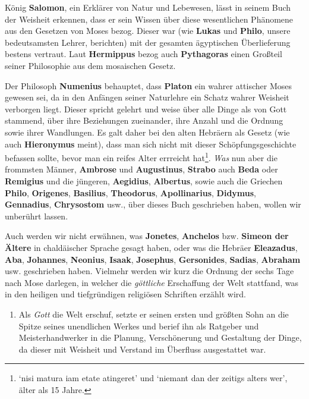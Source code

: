 \documentclass[
]{article}
\providecommand{\tightlist}{%
  \setlength{\itemsep}{0pt}\setlength{\parskip}{0pt}}
\begin{document}
König \textbf{Salomon}, ein Erklärer von Natur und Lebewesen, lässt in
seinem Buch der Weisheit erkennen, dass er sein Wissen über diese
wesentlichen Phänomene aus den Gesetzen von Moses bezog. Dieser war (wie
\textbf{Lukas} und \textbf{Philo}, unsere bedeutsamsten Lehrer,
berichten) mit der gesamten ägyptischen Überlieferung bestens vertraut.
Laut \textbf{Hermippus} bezog auch \textbf{Pythagoras} einen Großteil
seiner Philosophie aus dem mosaischen Gesetz.

Der Philosoph \textbf{Numenius} behauptet, dass \textbf{Platon} ein
wahrer attischer Moses gewesen sei, da in den Anfängen seiner Naturlehre
ein Schatz wahrer Weisheit verborgen liegt. Dieser spricht gelehrt und
weise über alle Dinge als von Gott stammend, über ihre Beziehungen
zueinander, ihre Anzahl und die Ordnung sowie ihrer Wandlungen. Es galt
daher bei den alten Hebräern als Gesetz (wie auch \textbf{Hieronymus}
meint), dass man sich nicht mit dieser Schöpfungsgeschichte befassen
sollte, bevor man ein reifes Alter errreicht hat\footnote{`nisi matura
  iam etate atingeret' und `niemant dan der zeitigs alters wer', älter
  als 15 Jahre.}. \emph{Was} nun aber die frommsten Männer,
\textbf{Ambrose} und \textbf{Augustinus}, \textbf{Strabo} auch
\textbf{Beda} oder \textbf{Remigius} und die jüngeren,
\textbf{Aegidius}, \textbf{Albertus}, sowie auch die Griechen
\textbf{Philo}, \textbf{Origenes}, \textbf{Basilius},
\textbf{Theodorus}, \textbf{Apollinarius}, \textbf{Didymus},
\textbf{Gennadius}, \textbf{Chrysostom} usw., über dieses Buch
geschrieben haben, wollen wir unberührt lassen.

Auch werden wir nicht erwähnen, was \textbf{Jonetes}, \textbf{Anchelos}
bzw. \textbf{Simeon der Ältere} in chaldäischer Sprache gesagt haben,
oder was die Hebräer \textbf{Eleazadus}, \textbf{Aba},
\textbf{Johannes}, \textbf{Neonius}, \textbf{Isaak}, \textbf{Josephus},
\textbf{Gersonides}, \textbf{Sadias}, \textbf{Abraham} usw. geschrieben
haben. Vielmehr werden wir kurz die Ordnung der sechs Tage nach Mose
darlegen, in welcher die \emph{göttliche} Erschaffung der Welt
stattfand, was in den heiligen und tiefgründigen religiösen Schriften
erzählt wird.

\begin{enumerate}
\def\labelenumi{(\Roman{enumi})}
\setcounter{enumi}{1}
\tightlist
\item
  Als \emph{Gott} die Welt erschuf, setzte er seinen ersten und größten
  Sohn an die Spitze seines unendlichen Werkes und berief ihn als
  Ratgeber und Meisterhandwerker in die Planung, Verschönerung und
  Gestaltung der Dinge, da dieser mit Weisheit und Verstand im Überfluss
  ausgestattet war.
\end{enumerate}
\end{document}
